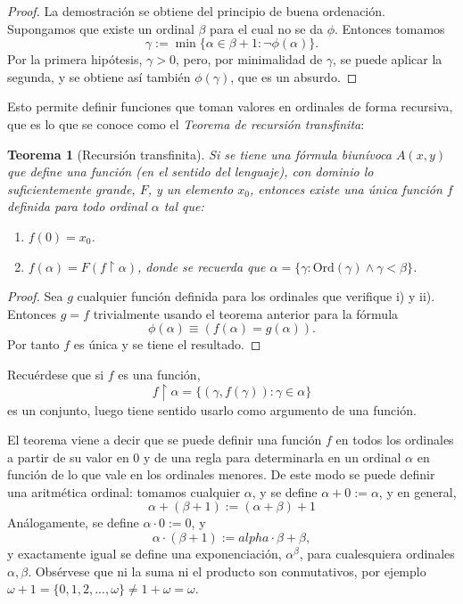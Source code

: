 \documentclass[11pt,a4paper]{book}
\theoremstyle{plain}
\newtheorem{teorema}{Teorema}[chapter]
\theoremstyle{definition}
\theoremstyle{remark}
\begin{document}
\begin{proof}
La demostración se obtiene del principio de buena ordenación.
Supongamos que existe un ordinal $\beta$ para el cual no se da $\phi$.
Entonces tomamos
\[
\gamma := \min\{\alpha \in \beta + 1 : \neg \phi(\alpha)\}.
\]
Por la primera hipótesis, $\gamma > 0$, pero, por minimalidad de $\gamma$, se puede aplicar la segunda, y se obtiene así también $\phi(\gamma)$, que es un absurdo.
\end{proof}

Esto permite definir funciones que toman valores en ordinales de forma recursiva, que es lo que se conoce como el \textit{Teorema de recursión transfinita}:

\begin{teorema}[Recursión transfinita]
Si se tiene una fórmula biunívoca $A(x,y)$ que define una función (en el sentido del lenguaje), con dominio lo suficientemente grande, $F$, y un elemento $x_0$, entonces existe una única función $f$ definida para todo ordinal $\alpha$ tal que:
\begin{enumerate}
    \item $f(0) = x_0$.
    \item $f(\alpha) = F(f\!\upharpoonright\!\alpha)$, donde se recuerda que 
    $\alpha = \{\gamma : \mathrm{Ord}(\gamma) \land \gamma < \beta\}$.
\end{enumerate}
\end{teorema}

\begin{proof}
Sea $g$ cualquier función definida para los ordinales que verifique i) y ii).
Entonces $g = f$ trivialmente usando el teorema anterior para la fórmula
\[
\phi(\alpha) \equiv (f(\alpha) = g(\alpha)).
\]
Por tanto $f$ es única y se tiene el resultado.
\end{proof}


Recuérdese que si $f$ es una función,
\[
f\!\upharpoonright\!\alpha = \{(\gamma, f(\gamma)) : \gamma \in \alpha\}
\]
es un conjunto, luego tiene sentido usarlo como argumento de una función.

El teorema viene a decir que se puede definir una función $f$ en todos los ordinales a partir de su valor en $0$ y de una regla para determinarla en un ordinal $\alpha$ en función de lo que vale en los ordinales menores. De este modo se puede definir una aritmética ordinal: tomamos cualquier $\alpha$, y se define $\alpha + 0 := \alpha$, y en general,
\[
\alpha + (\beta + 1) := (\alpha + \beta) + 1 
\]
Análogamente, se define $\alpha \cdot 0 := 0$, y
\[
\alpha \cdot (\beta + 1) := alpha \cdot \beta + \beta,
\]
y exactamente igual se define una exponenciación, $\alpha^\beta$, para cualesquiera ordinales $\alpha, \beta$. Obsérvese que ni la suma ni el producto son conmutativos, por ejemplo $\omega + 1 = \{ 0, 1, 2, ..., \omega \} \neq 1 + \omega = \omega$. 
\end{document}
